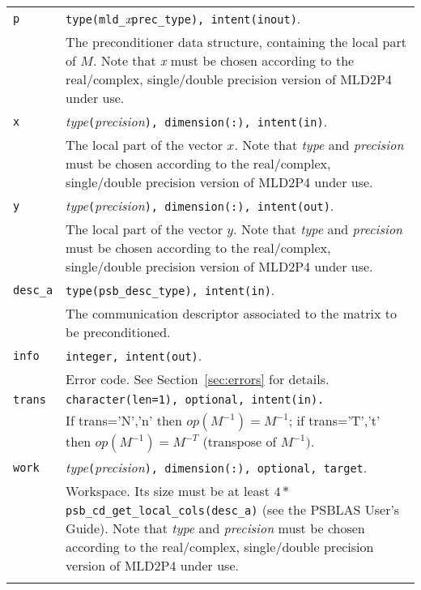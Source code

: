\begin{tabular}{p{1.2cm}p{11.5cm}}
\verb|p|      & \verb|type(mld_|\emph{x}\verb|prec_type), intent(inout)|.\\
              & The preconditioner data structure, containing the local part of $M$.
                Note that \emph{x} must be chosen according
                to the real/complex, single/double precision version of MLD2P4 under use.\\
\verb|x|      & \emph{type}\verb|(|\emph{precision}\verb|), dimension(:), intent(in)|.\\
              & The local part of the vector $x$. Note that \emph{type} and \emph{precision}
                must be chosen according
                to the real/complex, single/double precision version of MLD2P4 under use.\\
\verb|y|      & \emph{type}\verb|(|\emph{precision}\verb|), dimension(:), intent(out)|.\\
              & The local part of the vector $y$. Note that \emph{type} and \emph{precision}
                must be chosen according
                to the real/complex, single/double precision version of MLD2P4 under use.\\
\verb|desc_a| & \verb|type(psb_desc_type), intent(in)|. \\
              & The communication descriptor associated to the matrix to be
                preconditioned.\\
\verb|info|   & \verb|integer, intent(out)|.\\
              & Error code. See Section~\ref{sec:errors} for details.\\
\verb|trans|  & \verb|character(len=1), optional, intent(in).|\\
              & If trans='N','n' then $op(M^{-1}) = M^{-1}$;
                if trans='T','t' then $op(M^{-1}) = M^{-T}$ (transpose of $M^{-1})$.\\
\verb|work|  & \emph{type}\verb|(|\emph{precision}\verb|), dimension(:), optional, target|.\\
             & Workspace. Its size must be at
               least $4 *$ \verb|psb_cd_get_local_cols(desc_a)| (see the PSBLAS User's Guide).
               Note that \emph{type} and \emph{precision} must be chosen according
               to the real/complex, single/double precision version of MLD2P4 under use.\\\\
\end{tabular}


